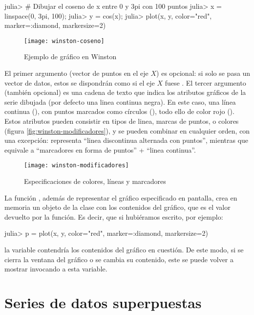 \begin{jlconcode}
julia> # Dibujar el coseno de x entre 0 y 3pi con 100 puntos
julia> x = linspace(0, 3pi, 100);
julia> y = cos(x);
julia> plot(x, y, color="red", marker=:diamond, markersize=2)
\end{jlconcode}

\begin{figure}
\centering
\texttt{[image: winston-coseno]}
\caption{Ejemplo de gráfico en Winston}
\label{fig:winston-coseno}
\end{figure}

El primer argumento (vector de puntos en el eje $X$) es opcional: si solo se pasa un vector de datos, estos se dispondrán como si el eje $X$ fuese \code{[1:length(y)]}. El tercer argumento (también opcional) es una cadena de texto que indica los atributos gráficos de la serie dibujada (por defecto una linea continua negra). En este caso, una línea continua (), con puntos marcados como círculos (), todo ello de color rojo (). Estos atributos pueden consistir en tipos de linea, marcas de puntos, o colores (figura \ref{fig:winston-modificadores}), y se pueden combinar en cualquier orden, con una excepción:  representa ``linea discontinua alternada con puntos'', mientras que  equivale a ``marcadores en forma de puntos'' + ``linea continua''.

\begin{figure}
\centering
\texttt{[image: winston-modificadores]}
\caption{Especificaciones de colores, líneas y marcadores}
\label{fig:winston-specs}
\end{figure}


La función , además de representar el gráfico especificado en pantalla, crea en memoria un objeto de la clase  con los contenidos del gráfico, que es el valor devuelto por la función. Es decir, que si hubiéramos escrito, por ejemplo:

\begin{jlconcode}
julia> p = plot(x, y, color="red", marker=:diamond, markersize=2)
\end{jlconcode}

la variable  contendría los contenidos del gráfico en cuestión. De este modo, si se cierra la ventana del gráfico o se cambia su contenido, este se puede volver a mostrar invocando a esta variable.

\section{Series de datos superpuestas}

